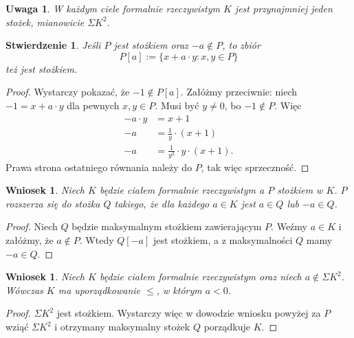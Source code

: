 \documentclass{article}
\theoremstyle{plain}
\newtheorem{stw}[thm]{Stwierdzenie}
\newtheorem{wn}[thm]{Wniosek}
\newtheorem{uw}[thm]{Uwaga}
\theoremstyle{definition}
\theoremstyle{remark}
\begin{document}
\begin{uw}
	W każdym ciele formalnie rzeczywistym $K$ jest przynajmniej jeden stożek, mianowicie $\Sigma K^2$.
\end{uw}
\begin{stw}
	Jeśli $P$ jest stożkiem oraz $-a \not \in P$, to zbiór $$P[a] := \{x + a \cdot y \colon x, y \in P\}$$ też jest stożkiem.
\end{stw}
\begin{proof}
	Wystarczy pokazać, że $-1 \not \in P[a]$.
	Załóżmy przeciwnie: niech $-1 = x + a \cdot y$ dla pewnych $x, y \in P$.
	Musi być $y \neq 0$, bo $-1 \not \in P$.
	Więc
	\begin{align*}
		-a \cdot y &= x + 1 \\
		-a &= \frac{1}{y} \cdot (x + 1) \\
		-a &= \frac{1}{y^2} \cdot y \cdot (x + 1).
	\end{align*}
	Prawa strona ostatniego równania należy do  $P$, tak więc sprzeczność.
\end{proof}
\begin{wn}
	 Niech $K$ będzie ciałem formalnie rzeczywistym a $P$ stożkiem w $K$.
	 $P$ rozszerza się do stożka $Q$ takiego, że dla każdego $a \in K$ jest $a \in Q$ lub $-a \in Q$.
\end{wn}
\begin{proof}
	 Niech $Q$ będzie maksymalnym stożkiem zawierającym $P$.
	 Weźmy $a \in K$ i załóżmy, że $a \not \in P$.
	 Wtedy $Q[-a]$ jest stożkiem, a z maksymalności $Q$ mamy $-a \in Q$.
\end{proof}

\begin{wn}
	\label{wn:forrz}
	 Niech $K$ będzie ciałem formalnie rzeczywistym oraz niech $a \not \in \Sigma K^2$.
	 Wówczas $K$ ma uporządkowanie $\leq$, w którym $a < 0$.
\end{wn}
\begin{proof}
	 $\Sigma K^2$ jest stożkiem.
	 Wystarczy więc w dowodzie wniosku powyżej za $P$ wziąć $\Sigma K^2$ i otrzymany maksymalny stożek $Q$ porządkuje $K$.
\end{proof}
\end{document}
